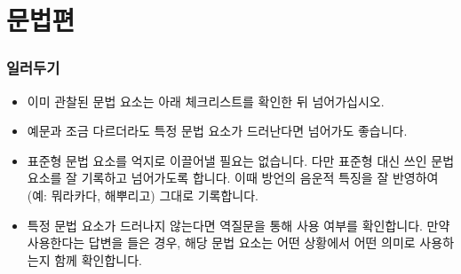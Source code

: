 \documentclass{snu-fl-questionnaire}
\begin{document}
















\chapter{문법편}

\subsection{일러두기}
\begin{itemize}[noitemsep]
  \item 이미 관찰된 문법 요소는 아래 체크리스트를 확인한 뒤 넘어가십시오.
  \item 예문과 조금 다르더라도 특정 문법 요소가 드러난다면 넘어가도 좋습니다.
  \item 표준형 문법 요소를 억지로 이끌어낼 필요는 없습니다. 다만 표준형 대신 쓰인 문법 요소를 잘 기록하고 넘어가도록 합니다. 이때 방언의 음운적 특징을 잘 반영하여(예: 뭐라카다, 해뿌리고) 그대로 기록합니다.
  \item 특정 문법 요소가 드러나지 않는다면 역질문을 통해 사용 여부를 확인합니다. 만약 사용한다는 답변을 들은 경우, 해당 문법 요소는 어떤 상황에서 어떤 의미로 사용하는지 함께 확인합니다.
\end{itemize}
\end{document}
